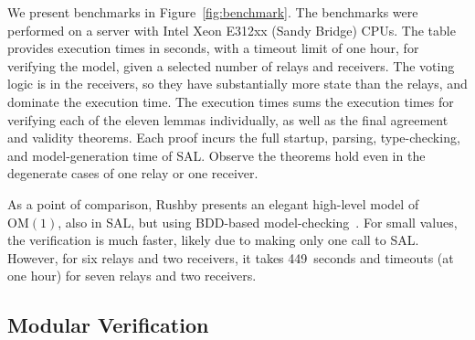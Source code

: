 \documentclass{llncs/llncs}
\newcommand{\OM}[1]{\ensuremath{\mathrm{OM}(#1)}\xspace}
\newcommand{\lee}[1]{ } %
\newcommand{\lee}[1]{ {\color{blue}$<$lee: #1$>$} } %
\begin{document}
{We present benchmarks in Figure~\ref{fig:benchmark}. The benchmarks were
performed on a server with Intel Xeon E312xx (Sandy Bridge) CPUs. The table provides execution times in seconds, with a timeout limit of one hour, for verifying the model, given a selected number of relays and receivers. The voting logic is in the receivers, so they have substantially more state than the relays, and dominate the execution time. The execution times sums the execution times for verifying each of the eleven lemmas individually, as well as the final agreement and validity theorems. Each proof incurs the full startup, parsing, type-checking, and model-generation time of SAL. Observe the theorems hold even in the degenerate cases of one relay or one receiver.

As a point of comparison, Rushby presents an elegant high-level model of \OM{1}, also in SAL, but using BDD-based model-checking~\cite{Rushby:OM1}. For small values, the verification is much faster, likely due to making only one call to SAL. However, for six relays and two receivers, it takes 449~seconds and timeouts (at one hour) for seven relays and two receivers.



\subsection{Modular Verification}\label{sec:modular}

}
\end{document}
